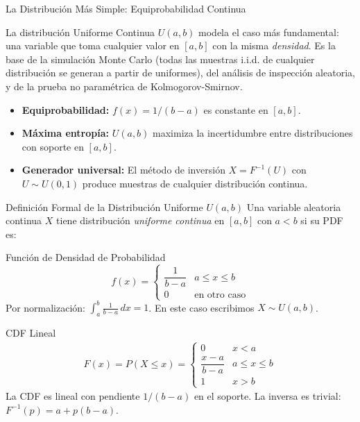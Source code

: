 \documentclass[10pt, aspectratio=169]{beamer}
\begin{document}
\begin{frame}{La Distribución Más Simple: Equiprobabilidad Continua}
  \footnotesize
  \begin{motivacion}
    La distribución Uniforme Continua $U(a, b)$ modela el caso más fundamental: una variable que toma cualquier valor en $[a, b]$ con la misma \emph{densidad}. Es la base de la simulación Monte Carlo (todas las muestras i.i.d. de cualquier distribución se generan a partir de uniformes), del análisis de inspección aleatoria, y de la prueba no paramétrica de Kolmogorov-Smirnov.
  \end{motivacion}

  \vspace{0.15cm}
  \pause
  \begin{itemize}\itemsep=0.1cm
    \item \textbf{Equiprobabilidad:} $f(x) = 1/(b-a)$ es constante en $[a, b]$. \pause
    \item \textbf{Máxima entropía:} $U(a, b)$ maximiza la incertidumbre entre distribuciones con soporte en $[a, b]$. \pause
    \item \textbf{Generador universal:} El método de inversión $X = F^{-1}(U)$ con $U \sim U(0, 1)$ produce muestras de cualquier distribución continua.
  \end{itemize}
\end{frame}

\begin{frame}{Definición Formal de la Distribución Uniforme $U(a, b)$}
  \footnotesize
  Una variable aleatoria continua $X$ tiene distribución \emph{uniforme continua} en $[a, b]$ con $a < b$ si su PDF es: \pause

  \vspace{0.1cm}
  \begin{block}{Función de Densidad de Probabilidad}
    $$f(x) = \begin{cases} \dfrac{1}{b-a} & a \le x \le b \\ 0 & \text{en otro caso} \end{cases}$$
    Por normalización: $\int_{a}^{b} \frac{1}{b-a}\,dx = 1$. En este caso escribimos $X \sim U(a, b)$.
  \end{block}

  \vspace{0.1cm}
  \pause
  \begin{alertblock}{CDF Lineal}
    \begin{align*}
      F(x) = P(X \le x) = \begin{cases} 0 & x < a \\ \dfrac{x-a}{b-a} & a \le x \le b \\ 1 & x > b \end{cases}
    \end{align*}
    La CDF es lineal con pendiente $1/(b-a)$ en el soporte. La inversa es trivial: $F^{-1}(p) = a + p(b-a)$.
  \end{alertblock}
\end{frame}
\end{document}
